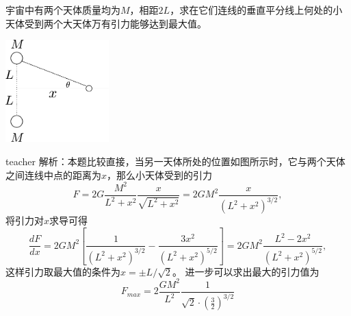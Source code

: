 \begin{example}
宇宙中有两个天体质量均为$M$，相距$2L$，求在它们连线的垂直平分线上何处的小天体受到两个大天体万有引力能够达到最大值。
\begin{flushright}
\includegraphics[width=0.3\textwidth]{images/cal-4.pdf} 
\end{flushright}
\begin{taggedblock}{teacher}
\noindent
解析：本题比较直接，当另一天体所处的位置如图所示时，它与两个天体之间连线中点的距离为$x$，那么小天体受到的引力
\[
F = 2G\frac{M^2}{L^2+x^2}\frac{x}{\sqrt{L^2+x^2}} = 2GM^2\frac{x}{(L^2+x^2)^{3/2}},
\]
将引力对$x$求导可得
\[
\frac{dF}{dx}=2GM^2[\frac{1}{(L^2+x^2)^{3/2}}-\frac{3x^2}{(L^2+x^2)^{5/2}}]=2GM^2\frac{L^2-2x^2}{(L^2+x^2)^{5/2}},
\]
这样引力取最大值的条件为$x=\pm L/\sqrt{2}$。
进一步可以求出最大的引力值为
\[
F_{max} = 2\frac{GM^2}{L^2}\frac{1}{\sqrt{2}\cdot (\frac{3}{2})^{3/2}}
\]
\end{taggedblock}
\end{example}



